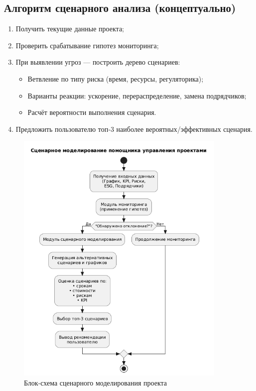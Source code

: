 \documentclass[12pt]{article}
\begin{document}
\subsection{Алгоритм сценарного анализа (концептуально)}
\begin{enumerate}
    \item Получить текущие данные проекта;
    \item Проверить срабатывание гипотез мониторинга;
    \item При выявлении угроз — построить дерево сценариев:
    \begin{itemize}
        \item Ветвление по типу риска (время, ресурсы, регуляторика);
        \item Варианты реакции: ускорение, перераспределение, замена подрядчиков;
        \item Расчёт вероятности выполнения сценария.
    \end{itemize}
    \item Предложить пользователю топ‑3 наиболее вероятных/эффективных сценария.
\end{enumerate}
\begin{figure}[H]
    \centering
    \includegraphics[width=0.9\textwidth]{1.png}
    \caption{Блок-схема сценарного моделирования проекта}
    \label{fig:scenario-model}
\end{figure}
\end{document}
